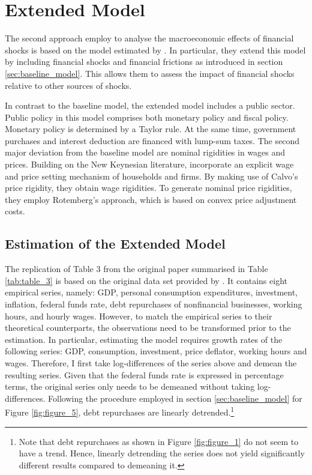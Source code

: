 \section{Extended Model}
\label{sec:extended_model}

The second approach \citeauthor{JERMANNfinancial} employ to analyse the macroeconomic effects of financial shocks is based on the model estimated by \citet{SMETSshocks}. In particular, they extend this model by including financial shocks and financial frictions as introduced in section \ref{sec:baseline_model}. This allows them to assess the impact of financial shocks relative to other sources of shocks. 

In contrast to the baseline model, the extended model includes a public sector. Public policy in this model comprises both monetary policy and fiscal policy. Monetary policy is determined by a Taylor rule. At the same time, government purchases and interest deduction are financed with lump-sum taxes. The second major deviation from the baseline model are nominal rigidities in wages and prices. Building on the New Keynesian literature, \citeauthor{JERMANNfinancial} incorporate an explicit wage and price setting mechanism of households and firms. By making use of Calvo's price rigidity, they obtain wage rigidities. To generate nominal price rigidities, they employ Rotemberg's approach, which is based on convex price adjustment costs.


\subsection{Estimation of the Extended Model}
\label{sec:extended_model_estimation}



The replication of Table 3 from the original paper summarised in Table \ref{tab:table_3} is based on the original data set provided by \citeauthor{JERMANNfinancial}. It contains eight empirical series, namely: GDP, personal consumption expenditures, investment, inflation, federal funds rate, debt repurchases of nonfinancial businesses, working hours, and hourly wages. However, to match the empirical series to their theoretical counterparts, the observations need to be transformed prior to the estimation. In particular, estimating the model requires growth rates of the following series: GDP, consumption, investment, price deflator, working hours and wages. Therefore, I first take log-differences of the series above and demean the resulting series. Given that the federal funds rate is expressed in percentage terms, the original series only needs to be demeaned without taking log-differences. Following the procedure employed in section \ref{sec:baseline_model} for Figure \ref{fig:figure_5}, debt repurchases are linearly detrended.\footnote{Note that debt repurchases as shown in Figure \ref{fig:figure_1} do not seem to have a trend. Hence, linearly detrending the series does not yield significantly different results compared to demeaning it.}

